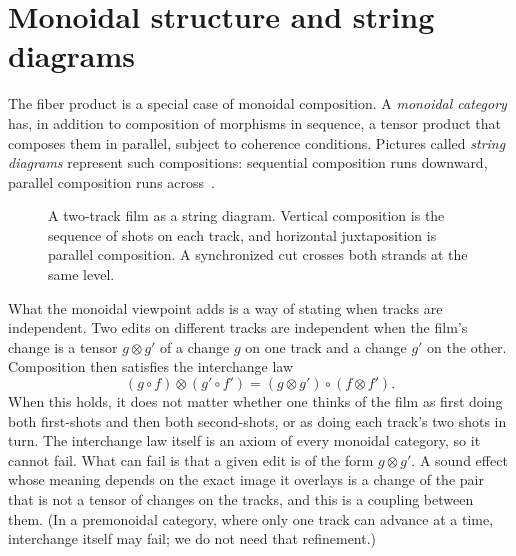 \section{Monoidal structure and string diagrams}

The fiber product is a special case of monoidal composition. A \emph{monoidal category} has, in addition to composition of morphisms in sequence, a tensor product that composes them in parallel, subject to coherence conditions. Pictures called \emph{string diagrams} represent such compositions: sequential composition runs downward, parallel composition runs across~\cite{selinger2011}.

\begin{figure}[ht]
\centering
{}
\caption{A two-track film as a string diagram. Vertical composition is the sequence of shots on each track, and horizontal juxtaposition is parallel composition. A synchronized cut crosses both strands at the same level.}
\label{fig:string}
\end{figure}

What the monoidal viewpoint adds is a way of stating when tracks are independent. Two edits on different tracks are independent when the film's change is a tensor $g\otimes g'$ of a change $g$ on one track and a change $g'$ on the other. Composition then satisfies the interchange law
\[
(g\circ f)\otimes(g'\circ f')=(g\otimes g')\circ(f\otimes f').
\]
When this holds, it does not matter whether one thinks of the film as first doing both first-shots and then both second-shots, or as doing each track's two shots in turn. The interchange law itself is an axiom of every monoidal category, so it cannot fail. What can fail is that a given edit is of the form $g\otimes g'$. A sound effect whose meaning depends on the exact image it overlays is a change of the pair that is not a tensor of changes on the tracks, and this is a coupling between them. (In a premonoidal category, where only one track can advance at a time, interchange itself may fail; we do not need that refinement.)

